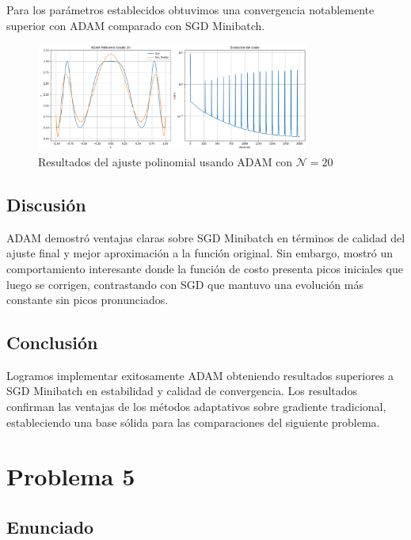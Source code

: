 \documentclass{article}
\begin{document}
Para los parámetros establecidos obtuvimos una convergencia notablemente superior con ADAM comparado con SGD Minibatch.

\begin{figure}[H]
    \centering
    \includegraphics[width=0.8\textwidth]{images/4_adam.png}
    \caption{Resultados del ajuste polinomial usando ADAM con $\mathcal{N}=20$}
    \label{fig:adam_results}
\end{figure}

\subsection{Discusión}

ADAM demostró ventajas claras sobre SGD Minibatch en términos de calidad del ajuste final y mejor aproximación a la función original. Sin embargo, mostró un comportamiento interesante donde la función de costo presenta picos iniciales que luego se corrigen, contrastando con SGD que mantuvo una evolución más constante sin picos pronunciados.

\subsection{Conclusión}

Logramos implementar exitosamente ADAM obteniendo resultados superiores a SGD Minibatch en estabilidad y calidad de convergencia. Los resultados confirman las ventajas de los métodos adaptativos sobre gradiente tradicional, estableciendo una base sólida para las comparaciones del siguiente problema.


\section{Problema 5}

\subsection{Enunciado}
\end{document}
